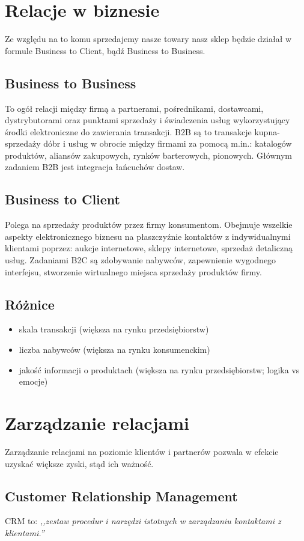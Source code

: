\documentclass{report}
\begin{document}
\section{Relacje w biznesie}
Ze względu na to komu sprzedajemy nasze towary nasz sklep będzie działał w formule Business to Client, bądź Business to Business.
\subsection{Business to Business}
To ogół relacji między firmą a partnerami, pośrednikami, dostawcami, dystrybutorami oraz punktami
sprzedaży i świadczenia usług wykorzystujący środki elektroniczne do zawierania transakcji. B2B są to
transakcje kupna-sprzedaży dóbr i usług w obrocie między firmami za pomocą m.in.: katalogów produktów, aliansów zakupowych, rynków barterowych, pionowych. Głównym zadaniem B2B jest integracja łańcuchów dostaw.
\subsection{Business to Client}
Polega na sprzedaży produktów przez firmy konsumentom. Obejmuje wszelkie aspekty elektronicznego biznesu na płaszczyźnie kontaktów z indywidualnymi klientami poprzez: aukcje internetowe, sklepy internetowe, sprzedaż detaliczną usług. Zadaniami B2C są zdobywanie nabywców, zapewnienie wygodnego interfejsu, stworzenie wirtualnego miejsca sprzedaży produktów firmy.
\subsection{Różnice}
\begin{itemize}
\item skala transakcji (większa na rynku przedsiębiorstw)
\item liczba nabywców (większa na rynku konsumenckim)
\item jakość informacji o produktach (większa na rynku przedsiębiorstw; logika vs emocje)
\end{itemize}
\section{Zarządzanie relacjami}
Zarządzanie relacjami na poziomie klientów i partnerów pozwala w efekcie uzyskać większe zyski, stąd ich ważność.
\subsection{Customer Relationship Management}
CRM to: \emph{,,zestaw procedur i narzędzi istotnych w zarządzaniu kontaktami z klientami.''}\cite{wiki:crm}
\end{document}
